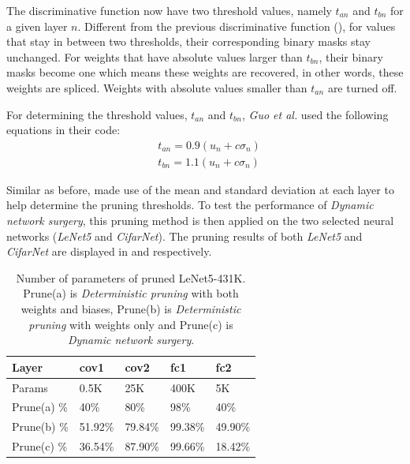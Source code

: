\documentclass[a4paper,12pt]{report}
\begin{document}
The discriminative function now have two threshold values, namely $t_{an}$ and
$t_{bn}$ for a given layer $n$.
Different from the previous discriminative function (), for values that stay in
between two thresholds, their corresponding binary masks stay unchanged.
For weights that have absolute values larger than $t_{bn}$, their binary masks
become one which means these weights are recovered, in other words, these weights
are spliced.
Weights with absolute values smaller than $t_{an}$ are turned off.

For determining the threshold values, $t_{an}$ and $t_{bn}$,
\textit{Guo et al.} used the following equations in their code:
\begin{equation}
  \begin{aligned}
  &t_{an} = 0.9 (u_n + c \sigma_n) \\
  &t_{bn} = 1.1 (u_n + c \sigma_n)
  \label{equ:hfunc_ds}
  \end{aligned}
\end{equation}

Similar as before,  made use of the mean and standard deviation
at each layer to help determine the pruning thresholds.
To test the performance of \textit{Dynamic network surgery}, this pruning method is
then applied on the two selected neural networks (\textit{LeNet5} and \textit{CifarNet}).
The pruning results of both \textit{LeNet5} and \textit{CifarNet} are displayed
in  and  respectively.

\begin{table}[!h]
\centering
\begin{tabular}{|l|l|l|l|l|}
\hline
Layer			&cov1	&cov2	&fc1	&fc2 		\\ \hline
Params		& 0.5K		&25K	&400K	&5K		\\
\hline
Prune(a) \%	& 40\%		&80\%	&98\%	&40\%	\\
\hline
Prune(b) \%	& 51.92\%		&79.84\%	&99.38\%	&49.90\%	 \\
\hline
Prune(c) \%	& 36.54\%		&87.90\%	&99.66\%	&18.42\%	 \\
\hline
\end{tabular}
\caption{Number of parameters of pruned LeNet5-431K.
Prune(a) is \textit{Deterministic pruning} with both weights and biases,
Prune(b) is \textit{Deterministic pruning} with weights only and
Prune(c) is \textit{Dynamic network surgery}.}
\label{tab:LeNetPrune3}
\end{table}
\end{document}
